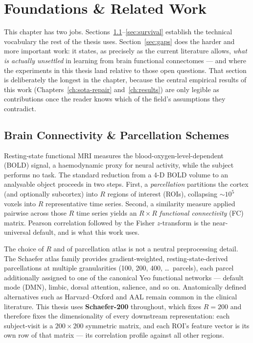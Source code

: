 \chapter{Foundations \& Related Work}
\label{ch:foundations}

This chapter has two jobs. Sections~\ref{sec:fc-parcellation}--\ref{sec:survival}
establish the technical vocabulary the rest of the thesis uses. Section~\ref{sec:gaps}
does the harder and more important work: it states, as precisely as the current
literature allows, \emph{what is actually unsettled} in learning from brain functional
connectomes --- and where the experiments in this thesis land relative to those open
questions. That section is deliberately the longest in the chapter, because the central
empirical results of this work (Chapters~\ref{ch:sota-repair} and~\ref{ch:results}) are
only legible as contributions once the reader knows which of the field's assumptions
they contradict.

\section{Brain Connectivity \& Parcellation Schemes}
\label{sec:fc-parcellation}

Resting-state functional MRI measures the blood-oxygen-level-dependent (BOLD) signal, a
haemodynamic proxy for neural activity, while the subject performs no task. The standard
reduction from a 4-D BOLD volume to an analysable object proceeds in two steps. First, a
\emph{parcellation} partitions the cortex (and optionally subcortex) into $R$ regions of
interest (ROIs), collapsing $\sim 10^5$ voxels into $R$ representative time series. Second,
a similarity measure applied pairwise across those $R$ time series yields an $R \times R$
\emph{functional connectivity} (FC) matrix. Pearson correlation followed by the Fisher
$z$-transform is the near-universal default, and is what this work uses.

The choice of $R$ and of parcellation atlas is not a neutral preprocessing detail. The
Schaefer atlas family provides gradient-weighted, resting-state-derived parcellations at
multiple granularities (100, 200, 400, \ldots\ parcels), each parcel additionally assigned
to one of the canonical Yeo functional networks --- default mode (DMN), limbic, dorsal
attention, salience, and so on. Anatomically defined alternatives such as Harvard--Oxford
and AAL remain common in the clinical literature. This thesis uses \textbf{Schaefer-200}
throughout, which fixes $R = 200$ and therefore fixes the dimensionality of every
downstream representation: each subject-visit is a $200 \times 200$ symmetric matrix, and
each ROI's feature vector is its own row of that matrix --- its correlation profile
against all other regions.

